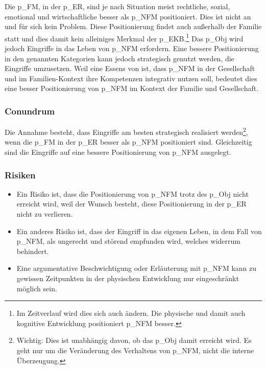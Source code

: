 Die \gls{p_FM}, in der \gls{p_ER}, sind je nach Situation meist rechtliche, sozial, emotional und wirtschaftliche besser als \gls{p_NFM} positioniert. Dies ist nicht an und für sich kein Problem. Diese Positionierung findet auch außerhalb der Familie statt und dies damit kein alleiniges Merkmal der \gls{p_EKB}.\footnote{
	Im Zeitverlauf wird dies sich auch ändern. Die physische und damit auch kognitive Entwicklung positioniert \gls{p_NFM} besser.
}
Das \gls{p_Obj}  wird jedoch Eingriffe in das Leben von \gls{p_NFM} erfordern. Eine bessere Positionierung in den genannten Kategorien kann jedoch strategisch genutzt werden, die Eingriffe umzusetzen. Weil eine Essens von  ist, dass
\gls{p_NFM} in der Gesellschaft und im Familien-Kontext ihre Kompetenzen integrativ nutzen soll, bedeutet dies eine besser Positionierung von \gls{p_NFM} im Kontext der Familie und Gesellschaft.\\ 

\subsubsection{Conundrum} Die Annahme besteht, dass Eingriffe am besten strategisch realisiert werden\footnote{
	Wichtig: Dies ist unabhängig davon, ob das \gls{p_Obj} damit erreicht wird. Es geht nur um die Veränderung des Verhaltens von \gls{p_NFM}, nicht die interne Überzeugung.
}, wenn die \gls{p_FM} in der \gls{p_ER} besser als \gls{p_NFM} positioniert sind. Gleichzeitig sind die Eingriffe auf eine bessere Positionierung von \gls{p_NFM} ausgelegt.\\

\subsubsection{Risiken}
\begin{itemize}
	\item Ein Risiko ist, dass die Positionierung von \gls{p_NFM} trotz des \gls{p_Obj} nicht erreicht wird, weil der Wunsch besteht, diese Positionierung in der \gls{p_ER} nicht zu verlieren. 
	\item Ein anderes Risiko ist, dass der Eingriff in das eigenen Leben, in dem Fall von \gls{p_NFM}, als ungerecht und störend empfunden wird, welches widerrum \NFMOTwo behindert.
	\item Eine argumentative Beschwichtigung oder Erläuterung mit \gls{p_NFM} kann zu gewissen Zeitpunkten in der physischen Entwicklung nur eingeschränkt möglich sein.
\end{itemize}

